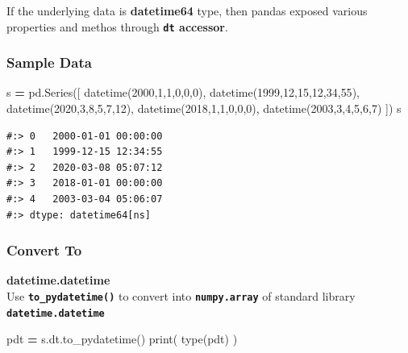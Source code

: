 \documentclass[
]{book}
\newenvironment{Shaded}{\begin{snugshade}}{\end{snugshade}}
\newcommand{\BuiltInTok}[1]{#1}
\newcommand{\DecValTok}[1]{\textcolor[rgb]{0.06,0.06,0.06}{#1}}
\newcommand{\NormalTok}[1]{#1}
\newcommand{\OperatorTok}[1]{\textcolor[rgb]{0.43,0.43,0.43}{\textbf{#1}}}
\begin{document}
If the underlying data is \textbf{datetime64} type, then pandas exposed various properties and methos through \textbf{\texttt{dt} accessor}.

\hypertarget{sample-data-5}{%
\subsubsection{Sample Data}\label{sample-data-5}}

\begin{Shaded}
\begin{Highlighting}[]
\NormalTok{s }\OperatorTok{=}\NormalTok{ pd.Series([}
\NormalTok{    datetime(}\DecValTok{2000}\NormalTok{,}\DecValTok{1}\NormalTok{,}\DecValTok{1}\NormalTok{,}\DecValTok{0}\NormalTok{,}\DecValTok{0}\NormalTok{,}\DecValTok{0}\NormalTok{),}
\NormalTok{    datetime(}\DecValTok{1999}\NormalTok{,}\DecValTok{12}\NormalTok{,}\DecValTok{15}\NormalTok{,}\DecValTok{12}\NormalTok{,}\DecValTok{34}\NormalTok{,}\DecValTok{55}\NormalTok{),}
\NormalTok{    datetime(}\DecValTok{2020}\NormalTok{,}\DecValTok{3}\NormalTok{,}\DecValTok{8}\NormalTok{,}\DecValTok{5}\NormalTok{,}\DecValTok{7}\NormalTok{,}\DecValTok{12}\NormalTok{),}
\NormalTok{    datetime(}\DecValTok{2018}\NormalTok{,}\DecValTok{1}\NormalTok{,}\DecValTok{1}\NormalTok{,}\DecValTok{0}\NormalTok{,}\DecValTok{0}\NormalTok{,}\DecValTok{0}\NormalTok{),}
\NormalTok{    datetime(}\DecValTok{2003}\NormalTok{,}\DecValTok{3}\NormalTok{,}\DecValTok{4}\NormalTok{,}\DecValTok{5}\NormalTok{,}\DecValTok{6}\NormalTok{,}\DecValTok{7}\NormalTok{)}
\NormalTok{])}
\NormalTok{s}
\end{Highlighting}
\end{Shaded}

\begin{verbatim}
#:> 0   2000-01-01 00:00:00
#:> 1   1999-12-15 12:34:55
#:> 2   2020-03-08 05:07:12
#:> 3   2018-01-01 00:00:00
#:> 4   2003-03-04 05:06:07
#:> dtype: datetime64[ns]
\end{verbatim}

\hypertarget{convert-to}{%
\subsubsection{Convert To}\label{convert-to}}

\textbf{datetime.datetime}\\
Use \textbf{\texttt{to\_pydatetime()}} to convert into \textbf{\texttt{numpy.array}} of standard library \textbf{\texttt{datetime.datetime}}

\begin{Shaded}
\begin{Highlighting}[]
\NormalTok{pdt  }\OperatorTok{=}\NormalTok{ s.dt.to_pydatetime()}
\BuiltInTok{print}\NormalTok{( }\BuiltInTok{type}\NormalTok{(pdt) )}
\end{Highlighting}
\end{Shaded}
\end{document}
